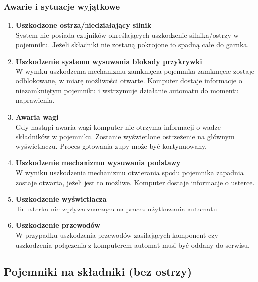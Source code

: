 \documentclass[12pt,a4paper,notitlepage]{article}
\begin{document}
\subsubsection{Awarie i sytuacje wyjątkowe}
\begin{enumerate}
  \item \textbf{Uszkodzone ostrza/niedziałający silnik}\\
System nie posiada czujników określających uszkodzenie silnika/ostrzy w pojemniku. Jeżeli składniki nie zostaną pokrojone to spadną całe do garnka.
  \item \textbf{Uszkodzenie systemu wysuwania blokady przykrywki}\\
W wyniku uszkodzenia mechanizmu zamknięcia pojemnika zamknięcie zostaje odblokowane, w miarę możliwości otwarte. Komputer dostaje informacje o niezamkniętym pojemniku i wstrzymuje działanie automatu do momentu naprawienia.
  \item \textbf{Awaria wagi}\\
Gdy nastąpi awaria wagi komputer nie otrzyma informacji o wadze składników w pojemniku. Zostanie wyświetlone ostrzeżenie na głównym wyświetlaczu. Proces gotowania zupy może być kontynuowany.
  \item \textbf{Uszkodzenie mechanizmu wysuwania podstawy}\\
W wyniku uszkodzenia mechanizmu otwierania spodu pojemnika zapadnia zostaje otwarta, jeżeli jest to możliwe. Komputer dostaje informacje o usterce.
  \item \textbf{Uszkodzenie wyświetlacza}\\
Ta usterka nie wpływa znacząco na proces użytkowania automatu.
  \item \textbf{Uszkodzenie przewodów}\\
W przypadku uszkodzenia przewodów zasilających komponent czy uszkodzenia połączenia z komputerem automat musi być oddany do serwisu.
\end{enumerate}


\subsection{Pojemniki na składniki (bez ostrzy)}
\end{document}
